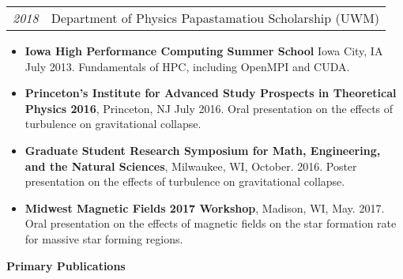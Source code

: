 \documentclass[12pt,notitlepage]{report}
\begin{document}
%
\begin{tabular}{ll}
{\it 2018} & Department of Physics Papastamatiou Scholarship (UWM)\\
%
\end{tabular}


%		

\bigskip
{}


\begin{itemize}

\item[]{\bf Iowa High Performance Computing Summer School} Iowa City, IA July 2013. Fundamentals of HPC, including OpenMPI and CUDA.

\item[]{\bf Princeton’s Institute for Advanced Study Prospects in Theoretical Physics 2016}, Princeton, NJ July 2016. Oral presentation on the effects of turbulence on gravitational collapse.

\item[]{\bf Graduate Student Research Symposium for Math, Engineering, and the Natural Sciences}, Milwaukee, WI, October. 2016. Poster presentation on the effects of turbulence on gravitational collapse.

\item[]{\bf Midwest Magnetic Fields 2017 Workshop}, Madison, WI, May. 2017. Oral presentation on the effects of magnetic fields on the star formation rate for massive star forming regions.

\end{itemize}

\bigskip
{}

\textbf{Primary Publications}
\end{document}
